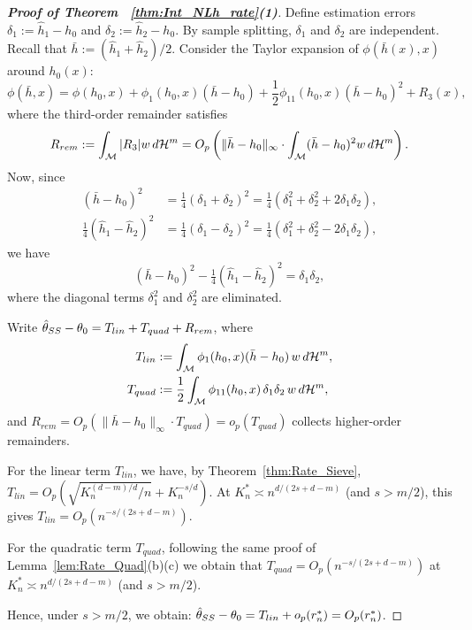 \documentclass[12pt,american]{article}
\newcommand{\cH}{\mathcal{H}}
\theoremstyle{definition}
\theoremstyle{plain}
\theoremstyle{definition}
\theoremstyle{plain}
\theoremstyle{plain}
\theoremstyle{plain}
\theoremstyle{plain}
\theoremstyle{plain}
\begin{document}
\begin{proof}[\textbf{Proof of Theorem ~\ref{thm:Int_NLh_rate}(1)}]
Define estimation errors $\delta_1 := \hat{h}_1 - h_0$ and $\delta_2 := \hat{h}_2 - h_0$. By sample splitting, $\delta_1$ and $\delta_2$ are independent. Recall that $\bar{h} := (\hat{h}_1 + \hat{h}_2)/2$.
Consider the Taylor expansion of $\phi(\bar{h}(x),x)$ around $h_0(x)$:
\[
\phi(\bar{h},x) = \phi(h_0,x) + \phi_1(h_0,x)(\bar{h} - h_0) + \frac{1}{2}\phi_{11}(h_0,x)(\bar{h} - h_0)^2 + R_3(x),
\]
where the third-order remainder satisfies $$R_{rem}:=\int_\cM |R_3| w\, d\cH^m = O_p\left(\|\bar{h} - h_0\|_\infty \cdot \int_\cM (\bar{h} - h_0)^2 w\, d\cH^m \right).$$
Now, since
\begin{align*}
(\bar{h} - h_0)^2 &= \tfrac{1}{4}(\delta_1 + \delta_2)^2 = \tfrac{1}{4}(\delta_1^2 + \delta_2^2 + 2\delta_1\delta_2), \\
\tfrac{1}{4}(\hat{h}_1 - \hat{h}_2)^2 &= \tfrac{1}{4}(\delta_1 - \delta_2)^2 = \tfrac{1}{4}(\delta_1^2 + \delta_2^2 - 2\delta_1\delta_2),
\end{align*}
we have
\[
(\bar{h} - h_0)^2 - \tfrac{1}{4}(\hat{h}_1 - \hat{h}_2)^2 = \delta_1 \delta_2,
\]
where the diagonal terms $\delta_1^2$ and $\delta_2^2$ are eliminated.

Write $\hat{\theta}_{SS} - \theta_0 = T_{lin} + T_{quad} + R_{rem}$, where
\begin{align*}
T_{lin} &:= \int_\cM \phi_1(h_0,x)(\bar{h} - h_0)\, w\, d\cH^m, \\
T_{quad} &:= \frac{1}{2}\int_\cM \phi_{11}(h_0,x)\, \delta_1\delta_2\, w\, d\cH^m,
\end{align*}
and $R_{rem}= O_p\left(\|\bar{h} - h_0\|_\infty \cdot T_{quad} \right)=o_p\left( T_{quad} \right) $ collects higher-order remainders.

For the linear term $T_{lin}$, we have, by Theorem~\ref{thm:Rate_Sieve}, $T_{lin} = O_p(\sqrt{K_n^{(d-m)/d}/n} + K_n^{-s/d})$. At $K^*_n \asymp n^{d/(2s+d-m)}$ (and $s > m/2$), this gives $T_{lin} = O_p(n^{-s/(2s+d-m)})$.

For the quadratic term $T_{quad}$, following the same proof of Lemma~\ref{lem:Rate_Quad}(b)(c) we obtain that $T_{quad} = O_p(n^{-s/(2s+d-m)})$  at $K^*_n \asymp n^{d/(2s+d-m)}$ (and $s > m/2$).

Hence, under $s > m/2$, we obtain: $\hat{\theta}_{SS} - \theta_0 = T_{lin} + o_p(r_n^*) = O_p(r_n^*)$.
\end{proof}
\end{document}
